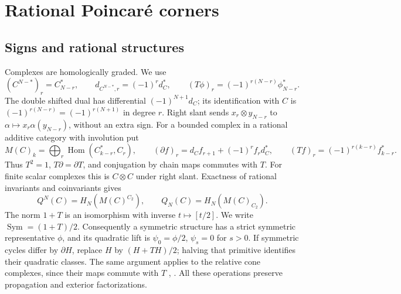 \documentclass[11pt]{amsart}
\numberwithin{equation}{section}
\theoremstyle{definition}
\theoremstyle{remark}
\DeclareMathOperator{\Sym}{Sym}
\begin{document}
\section{Rational Poincar\'e corners}\label{alg:corners}

\subsection{Signs and rational structures}\label{alg:qmodel}
Complexes are homologically graded. We use
\begin{equation}\label{alg:dualconvention}
 (C^{N-*})_r=C_{N-r}^*,\qquad d_{C^{N-*},r}=(-1)^rd_C^*,\qquad
 (T\phi)_r=(-1)^{r(N-r)}\phi_{N-r}^*.
\end{equation}
The double shifted dual has differential $(-1)^{N+1}d_C$; its
identification with $C$ is $(-1)^{r(N-r)}=(-1)^{r(N+1)}$ in degree $r$.
Right slant sends $x_r\otimes y_{N-r}$ to
$\alpha\mapsto x_r\alpha(y_{N-r})$, without an extra sign.
For a bounded complex in a rational additive category with involution put
\[
 M(C)_k=\bigoplus_r\operatorname{Hom}(C_{k-r}^*,C_r),\qquad
 (\partial f)_r=d_Cf_{r+1}+(-1)^rf_rd_C^*,\qquad
 (Tf)_r=(-1)^{r(k-r)}f_{k-r}^*.
\]
Thus $T^2=1$, $T\partial=\partial T$, and conjugation by chain maps
commutes with $T$. For finite scalar complexes this is $C\otimes C$
under right slant. Exactness of rational invariants and coinvariants gives
\begin{equation}\label{alg:qgroups}
 Q^N(C)=H_N(M(C)^{C_2}),\qquad Q_N(C)=H_N(M(C)_{C_2}).
\end{equation}
The norm $1+T$ is an isomorphism with inverse $t\mapsto[t/2]$.
We write $\Sym=(1+T)/2$.
Consequently a symmetric structure has a strict symmetric representative
$\phi$, and its quadratic lift is $\psi_0=\phi/2$, $\psi_s=0$ for $s>0$.
If symmetric cycles differ by $\partial H$, replace $H$ by $(H+TH)/2$;
halving that primitive identifies their quadratic classes. The same
argument applies to the relative cone complexes, since their maps commute
with $T$ \cite[Proposition 3.3]{Ran80I}, \cite[Section 3]{Ran89}.
All these operations preserve propagation and exterior factorizations.
\end{document}
